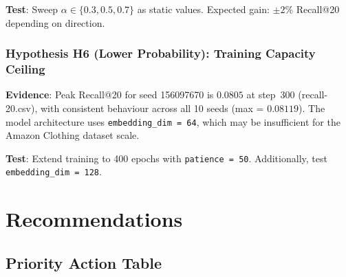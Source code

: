 \documentclass[12pt,a4paper]{article}
\begin{document}
\textbf{Test}: Sweep $\alpha \in \{0.3, 0.5, 0.7\}$ as static values.
Expected gain: $\pm 2\%$ Recall@20 depending on direction.

\subsubsection*{Hypothesis H6 (Lower Probability): Training Capacity
Ceiling}

\textbf{Evidence}: Peak Recall@20 for seed 156097670 is $0.0805$ at
step~300 (recall-20.csv), with consistent behaviour across all 10 seeds
(max = $0.08119$).  The model architecture uses
\texttt{embedding\_dim = 64}, which may be insufficient for the Amazon
Clothing dataset scale.

\textbf{Test}: Extend training to 400 epochs with
\texttt{patience = 50}.  Additionally, test \texttt{embedding\_dim = 128}.

\section{Recommendations}
\label{sec:recommendations}

\subsection{Priority Action Table}
\end{document}
